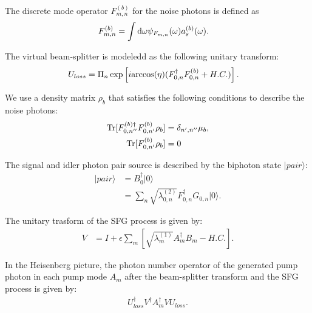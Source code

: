\documentclass[../../note.tex]{subfiles}
\begin{document}
\begin{definition}
    The discrete mode operator $F_{m,n}^(b)$ for the noise photons is defined as
    \begin{align}
        F_{m,n}^{(b)}
        &= \int {\rm d}\omega \psi_{F_{m,n}}(\omega)a_s^{(b)}(\omega). 
    \end{align}
\end{definition}

\begin{definition}
    The virtual beam-splitter is modeledd as the following unitary transform:
    \begin{align}
        U_{loss}
        &= \Pi_{n} \exp\left[i {\rm arccos}(\eta)(F_{0,n}^\dagger F_{0,n}^{(b)} + H.C.)\right].
    \end{align}
\end{definition}

\begin{definition}
    We use a density matrix $\rho_b$ that satisfies the following conditions to describe the noise photons:
    \begin{align}
        \operatorname{Tr}[F_{0,n''}^{(b) \dagger} F_{0,n'}^{(b)} \rho_b] 
        &= \delta_{n',n''} \mu_b, \\
        \operatorname{Tr}[F_{0,n'}^{(b)} \rho_b]
        &= 0
    \end{align}
\end{definition}

\begin{definition}
    The signal and idler photon pair source is described by the biphoton state  $\vert pair \rangle$:
    \begin{align}
        \vert pair \rangle
        &= B_0^\dagger \vert 0 \rangle \\
        &= \sum_{n} \sqrt{\lambda_{0,n}^{(2)}} F_{0,n}^\dagger G_{0,n} \vert 0 \rangle.
    \end{align}
\end{definition}

\begin{definition}
    The unitary trasform of the SFG process is given by:
    \begin{align}
        V
        &= I + \epsilon \sum_{m} \left[\sqrt{\lambda_m^{(1)}} A_m^\dagger B_m - H.C. \right].
    \end{align}
\end{definition}

\begin{definition}
    In the Heisenberg picture, the photon number operator of the generated pump photon in each pump mode $A_m$ after the beam-splitter transform and the SFG process is given by:
    \begin{align}
        U^\dagger_{loss} V^\dagger A_{m}^\dagger V U_{loss}.
    \end{align}
\end{definition}
\end{document}
